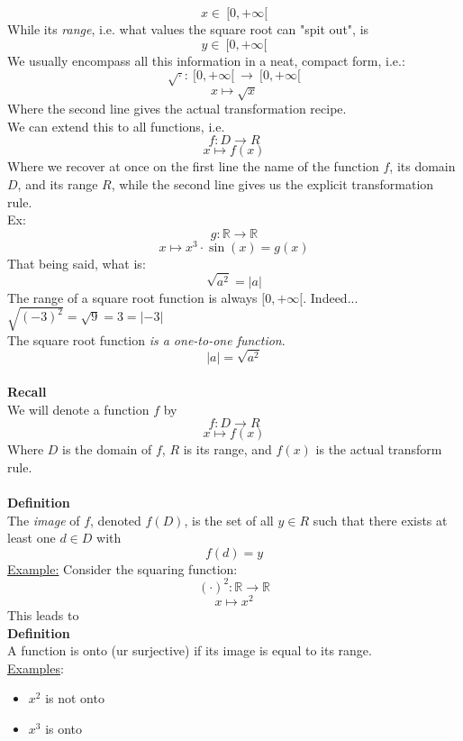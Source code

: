 \documentclass[]{article}
\begin{document}
	$$x\in~[0, +\infty[$$
	While its \emph{range}, i.e. what values the square root can "spit out", is
	$$y\in~[0,+\infty[$$
	We usually encompass all this information in a neat, compact form, i.e.:
	$$\sqrt{\cdot}:~[0,+\infty[~\rightarrow~[0,+\infty[$$
	$$x\mapsto\sqrt{x}$$
	Where the second line gives the actual transformation recipe.
	\pagebreak\\
	We can extend this to all functions, i.e.
	$$f:D\longrightarrow R$$
	$$x\mapsto f(x)$$
	Where we recover at once on the first line the name of the function $f$, its domain $D$, and its range $R$, while the second line gives us the explicit transformation rule.\\
	Ex:
	$$g:\mathbb{R}\longrightarrow\mathbb{R}$$
	$$x\mapsto x^3\cdot\sin(x)=g(x)$$
	That being said, what is:
	$$\sqrt{a^2}=|a|$$
	The range of a square root function is always $[0,+\infty[$. Indeed... $\sqrt{(-3)^2}=\sqrt{9}=3=|-3|$\\
	The square root function \emph{is a one-to-one function}.\\
	$$|a|=\sqrt{a^2}$$
	\pagebreak\\
	{\bf Recall}\\
	We will denote a function $f$ by
	$$f:D\rightarrow R$$
	$$x\mapsto f(x)$$
	Where $D$ is the domain of $f$, $R$ is its range, and $f(x)$ is the actual transform rule.\\\\
	{\bf Definition}\\
	The \emph{image} of $f$, denoted $f(D)$, is the set of all $y\in R$ such that there exists at least one $d\in D$ with
	$$f(d)=y$$
	\underline{Example:} Consider the squaring function:
	$$(\cdot)^2:\mathbb{R}\rightarrow\mathbb{R}$$
	$$x\mapsto  x^2$$
	This leads to\\
	{\bf Definition}\\
	A function is onto (ur surjective) if its image is equal to its range.\\
	\underline{Examples}:
	\begin{itemize}
		\item $x^2$ is not onto
		\item $x^3$ is onto
	\end{itemize}
\end{document}
